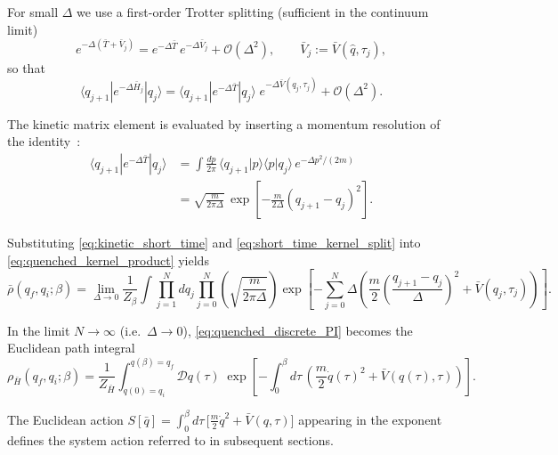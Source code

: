 For small $\Delta$ we use a first-order Trotter splitting (sufficient in the continuum
limit)~\cite{kleinertPathIntegralsQuantum2009}
\begin{equation}
    e^{-\Delta(\bar T+\bar V_j)}
    =
    e^{-\Delta \bar T}\,e^{-\Delta \bar V_j}
    +\mathcal O(\Delta^2),
    \qquad
    \bar V_j:=\bar V(\hat q,\tau_j),
    \label{eq:trotter_split}
\end{equation}
so that
\begin{equation}
    \langle q_{j+1}|e^{-\Delta \bar H_j}|q_j\rangle
    =
    \langle q_{j+1}|e^{-\Delta \bar T}|q_j\rangle\;
    e^{-\Delta \bar V(q_j,\tau_j)}
    +\mathcal O(\Delta^2).
    \label{eq:short_time_kernel_split}
\end{equation}

The kinetic matrix element is evaluated by inserting a momentum resolution of
the identity~\cite{feynmanQuantumMechanicsPath1965,schulmanTechniquesApplicationsPath1981}:
\begin{align}
    \langle q_{j+1}|e^{-\Delta \bar T}|q_j\rangle
    &=
    \int \frac{dp}{2\pi}\,
    \langle q_{j+1}|p\rangle\langle p|q_j\rangle\,e^{-\Delta p^2/(2m)}
    \nonumber\\
    &=
    \sqrt{\frac{m}{2\pi\Delta}}\,
    \exp\!\left[-\frac{m}{2\Delta}(q_{j+1}-q_j)^2\right].
    \label{eq:kinetic_short_time}
\end{align}
\begin{widetext}
Substituting \eqref{eq:kinetic_short_time} and \eqref{eq:short_time_kernel_split} into
\eqref{eq:quenched_kernel_product} yields
\begin{equation}
    \bar\rho(q_f,q_i;\beta)
    =
    \lim_{\Delta\to 0}\frac{1}{Z_\beta}
    \int \prod_{j=1}^{N} dq_j
    \prod_{j=0}^{N}
    \left(\sqrt{\frac{m}{2\pi\Delta}}\right)
    \exp\!\left[
        -\sum_{j=0}^{N}
        \Delta\left(
            \frac{m}{2}\left(\frac{q_{j+1}-q_j}{\Delta}\right)^2
            +\bar V(q_j,\tau_j)
        \right)
    \right].
    \label{eq:quenched_discrete_PI}
\end{equation}

In the limit $N\to\infty$ (i.e.\ $\Delta\to 0$), \eqref{eq:quenched_discrete_PI} becomes the
Euclidean path integral~\cite{feynmanQuantumMechanicsPath1965,kleinertPathIntegralsQuantum2009,groscheHandbookFeynmanPath1998}
\begin{equation}
    \rho_{\bar H}(q_f,q_i;\beta)
    =
    \frac{1}{Z_{\bar H}}
    \int_{q(0)=q_i}^{q(\beta)=q_f}\!\!\mathcal D q(\tau)\;
    \exp\!\left[
        -\int_0^\beta d\tau\,
        \left(
            \frac{m}{2}\dot q(\tau)^2+\bar V(q(\tau),\tau)
        \right)
    \right].
    \label{eq:quenched_continuum_PI}
\end{equation}
\end{widetext}
The Euclidean action $S[\bar q]=\int_0^\beta d\tau\,\big[\frac{m}{2}\dot q^2+\bar V(q,\tau)\big]$
appearing in the exponent defines the system action referred to in subsequent
sections.
